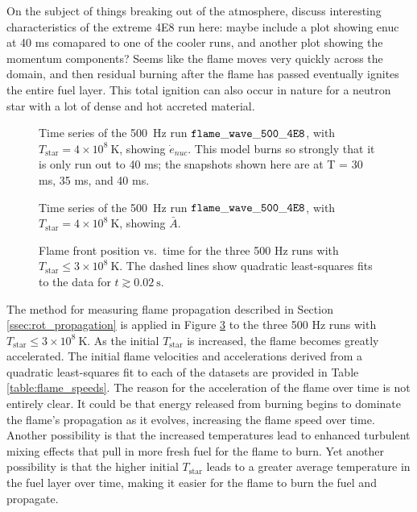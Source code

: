 \documentclass[preprint,times,tighten]{aastex63}
\begin{document}
{\color{red} On the subject of things breaking out of the atmosphere, discuss interesting characteristics of the extreme 4E8 run here: maybe include a plot showing enuc at 40 ms comapared to one of the cooler runs, and another plot showing the momentum components? Seems like the flame moves very quickly across the domain, and then residual burning after the flame has passed eventually ignites the entire fuel layer. This total ignition can also occur in nature for a neutron star with a lot of dense and hot accreted material.}

\begin{figure}[t]
	\centering
	\caption{\label{fig:4e8_stacked_enuc} Time series of the 500~Hz run $\tt{flame\_wave\_500\_4E8}$, with $T_{\mathrm{star}} = 4 \times 10^8~\mathrm{K}$, showing $\dot{e}_{nuc}$. This model burns so strongly that it is only run out to 40 ms; the snapshots shown here are at T = 30 ms, 35 ms, and 40 ms.}
\end{figure}

\begin{figure}[t]
	\centering
	\caption{\label{fig:4e8_stacked_abar} Time series of the 500~Hz run $\tt{flame\_wave\_500\_4E8}$, with $T_{\mathrm{star}} = 4 \times 10^8~\mathrm{K}$, showing $\bar{A}$.}
\end{figure}

\begin{figure}[t]
	\centering
	\caption{\label{fig:flame_speeds_2} Flame front position vs.\ time for the three 500 Hz runs with
		$T_{\mathrm{star}} \leq 3 \times 10^8~\mathrm{K}$. The dashed lines show quadratic least-squares fits to the data
		for $t \gtrsim 0.02~\mathrm{s}$.}
\end{figure}

The method for measuring flame propagation described in Section \ref{ssec:rot_propagation} is applied in Figure \ref{fig:flame_speeds_2} to the three 500 Hz runs with $T_{\mathrm{star}} \leq 3 \times 10^8~\mathrm{K}$. As the initial $T_{\mathrm{star}}$ is increased, the flame becomes greatly accelerated. The initial flame velocities and accelerations derived from a quadratic least-squares fit to each of the datasets are provided in Table \ref{table:flame_speeds}. The reason for the acceleration of the flame over time is not entirely clear. It could be that energy released from burning begins to dominate the flame's propagation as it evolves, increasing the flame speed over time. Another possibility is that the increased temperatures lead to enhanced turbulent mixing effects that pull in more fresh fuel for the flame to burn. Yet another possibility is that the higher initial $T_{\mathrm{star}}$ leads to a greater average temperature in the fuel layer over time, making it easier for the flame to burn the fuel and propagate.
\end{document}
